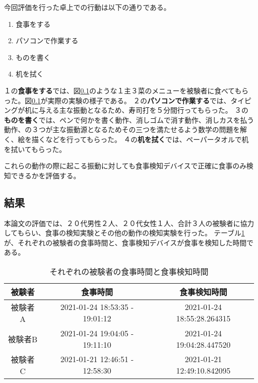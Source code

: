 今回評価を行った卓上での行動は以下の通りである。

\begin{enumerate}
  \item 食事をする
  \item パソコンで作業する
  \item ものを書く
  \item 机を拭く
\end{enumerate}

１の\textbf{食事をする}では、図\ref{}のような１主３菜のメニューを被験者に食べてもらった。図\ref{}が実際の実験の様子である。
２の\textbf{パソコンで作業する}では、タイピングが机に与える主な振動となるため、寿司打\cite{sushida}を５分間行ってもらった。
３の\textbf{ものを書く}では、ペンで何かを書く動作、消しゴムで消す動作、消しカスを払う動作、の３つが主な振動源となるためその三つを満たせるよう数学の問題を解く、絵を描くなどを行ってもらった。
４の\textbf{机を拭く}では、ペーパータオルで机を拭いてもらった。

これらの動作の際に起こる振動に対しても食事検知デバイスで正確に食事のみ検知できるかを評価する。

\subsection{結果}

本論文の評価では、２０代男性２人、２０代女性１人、合計３人の被験者に協力してもらい、食事の検知実験とその他の動作の検知実験を行った。
テーブル\ref{tb:meal_detection_result}が、それぞれの被験者の食事時間と、食事検知デバイスが食事を検知した時間である。

\begin{table}[htbp]
  \caption{それぞれの被験者の食事時間と食事検知時間}
  \label{tb:meal_detection_result}
  \begin{center}
    \begin{tabular}{|c||c|c|}
      \hline
      被験者  & 食事時間 & 食事検知時間 \\
      \hline\hline
      被験者A & 2021-01-24 18:53:35 - 19:01:12 & 2021-01-24 18:55:28.264315 \\\hline
      被験者B & 2021-01-24 19:04:05 - 19:11:10 & 2021-01-24 19:04:28.447520 \\\hline
      被験者C & 2021-01-21 12:46:51 - 12:58:30 & 2021-01-21 12:49:10.842095 \\\hline
    \end{tabular}
  \end{center}
\end{table}

